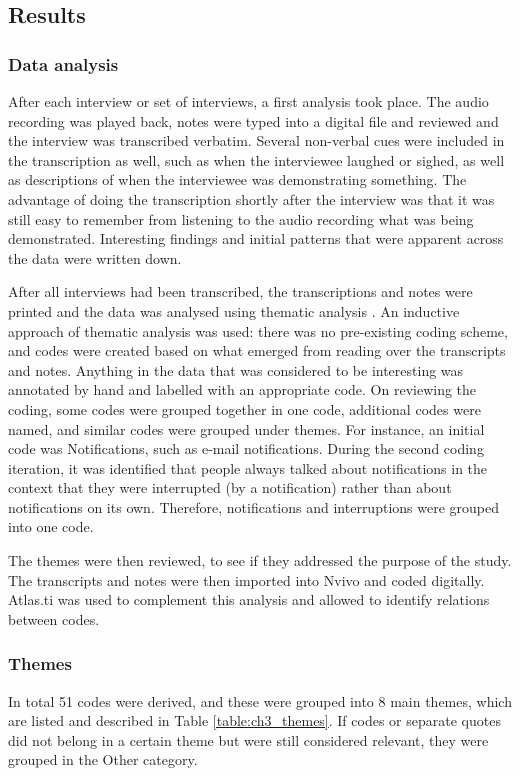 \subsection{Results}
\subsubsection{Data analysis}
After each interview or set of interviews, a first analysis took place. The audio recording was played back, notes were typed into a digital file and reviewed and the interview was transcribed verbatim. Several non-verbal cues were included in the transcription as well, such as when the interviewee laughed or sighed, as well as descriptions of when the interviewee was demonstrating something. The advantage of doing the transcription shortly after the interview was that it was still easy to remember from listening to the audio recording what was being demonstrated. Interesting findings and initial patterns that were apparent across the data were written down. 

After all interviews had been transcribed, the transcriptions and notes were printed and the data was analysed using thematic analysis \citep{Braun2006}. An inductive approach of thematic analysis was used: there was no pre-existing coding scheme, and codes were created based on what emerged from reading over the transcripts and notes. Anything in the data that was considered to be interesting was annotated by hand and labelled with an appropriate code. On reviewing the coding, some codes were grouped together in one code, additional codes were named, and similar codes were grouped under themes. For instance, an initial code was Notifications, such as e-mail notifications. During the second coding iteration, it was identified that people always talked about notifications in the context that they were interrupted (by a notification) rather than about notifications on its own. Therefore, notifications and interruptions were grouped into one code. 

The themes were then reviewed, to see if they addressed the purpose of the study. The transcripts and notes were then imported into Nvivo and coded digitally. Atlas.ti was used to complement this analysis and allowed to identify relations between codes. 

\subsubsection{Themes}
In total 51 codes were derived, and these were grouped into 8 main themes, which are listed and described in Table \ref{table:ch3_themes}. If codes or separate quotes did not belong in a certain theme but were still considered relevant, they were grouped in the Other category. 

